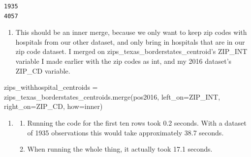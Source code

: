 \documentclass[
  letterpaper,
  DIV=11,
  numbers=noendperiod]{scrartcl}
\newenvironment{Shaded}{\begin{snugshade}}{\end{snugshade}}
\newcommand{\NormalTok}[1]{\textcolor[rgb]{0.00,0.23,0.31}{#1}}
\newcommand{\OperatorTok}[1]{\textcolor[rgb]{0.37,0.37,0.37}{#1}}
\newcommand{\StringTok}[1]{\textcolor[rgb]{0.13,0.47,0.30}{#1}}
\providecommand{\tightlist}{%
  \setlength{\itemsep}{0pt}\setlength{\parskip}{0pt}}\usepackage{longtable,booktabs,array}
\begin{document}
\begin{verbatim}
1935
4057
\end{verbatim}

\begin{enumerate}
\def\labelenumi{\arabic{enumi}.}
\setcounter{enumi}{2}
\tightlist
\item
  This should be an inner merge, because we only want to keep zip codes
  with hospitals from our other dataset, and only bring in hospitals
  that are in our zip code dataset. I merged on
  zips\_texas\_borderstates\_centroid's ZIP\_INT variable I made earlier
  with the zip codes as int, and my 2016 dataset's ZIP\_CD variable.
\end{enumerate}

\begin{Shaded}
\begin{Highlighting}[]
\NormalTok{zips\_withhospital\_centroids }\OperatorTok{=}\NormalTok{ zips\_texas\_borderstates\_centroids.merge(pos2016, left\_on}\OperatorTok{=}\StringTok{\textquotesingle{}ZIP\_INT\textquotesingle{}}\NormalTok{, right\_on}\OperatorTok{=}\StringTok{\textquotesingle{}ZIP\_CD\textquotesingle{}}\NormalTok{, how}\OperatorTok{=}\StringTok{\textquotesingle{}inner\textquotesingle{}}\NormalTok{)}
\end{Highlighting}
\end{Shaded}

\begin{enumerate}
\def\labelenumi{\arabic{enumi}.}
\setcounter{enumi}{3}
\tightlist
\item
  \begin{enumerate}
  \def\labelenumii{\alph{enumii}.}
  \tightlist
  \item
    Running the code for the first ten rows took 0.2 seconds. With a
    dataset of 1935 observations this would take approximately 38.7
    seconds.
  \item
    When running the whole thing, it actually took 17.1 seconds.
  \end{enumerate}
\end{enumerate}
\end{document}
